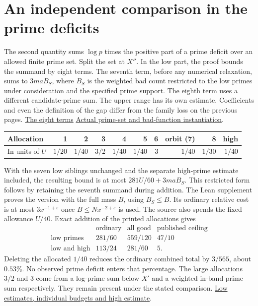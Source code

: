 \documentclass[12pt,letterpaper]{article}
\newcommand{\orig}[3]{\href{https://github.com/nousentllc/riemann-hypothesis/blob/40e56bab026552e089d7afcfeff08d2defb9c005/src/#1.lean\#L#2}{#3}}
\newcommand{\pagepart}[1]{\clearpage\section{#1}}
\begin{document}
\pagepart{An independent comparison in the prime deficits}
The second quantity sums \(\log p\) times the positive part of a prime deficit over an allowed finite prime set. Split the set at \(X''\). In the low part, the proof bounds the summand by eight terms. The seventh term, before any numerical relaxation, sums to \(3maB_S\), where \(B_S\) is the weighted bad count restricted to the low primes under consideration and the specified prime support. The eighth term uses a different candidate-prime sum. The upper range has its own estimate. Coefficients and even the definition of the gap differ from the family loss on the previous pages.
\orig{Formalism/SharpRestriction/GrowthBounds/LogarithmicSums/SecondConstantNonneg}{85}{The eight terms}\quad
\orig{Formalism/SharpRestriction/GrowthBounds/LogarithmicSums/LatticeChainSuccOfPartial}{189}{Actual prime-set and bad-function instantiation}.

\begin{center}\small
\begin{tabular}{@{}lrrrrrrrrr@{}}
\toprule
Allocation & 1 & 2 & 3 & 4 & 5 & 6 & orbit (7) & 8 & high\\\midrule
In units of \(U\) & \(1/20\) & \(1/40\) & \(3/2\) & \(1/40\) & \(1/40\) & \(3\) & \(1/40\) & \(1/30\) & \(1/40\)\\\bottomrule
\end{tabular}
\end{center}
With the seven low siblings unchanged and the separate high-prime estimate included, the resulting bound is at most \(281U/60+3maB_S\). This restricted form follows by retaining the seventh summand during addition. The Lean supplement proves the version with the full mass \(B\), using \(B_S\le B\). Its ordinary relative cost is at most \(3x^{-1+\varepsilon}\) once \(B\le Nx^{-2+\varepsilon}\) is used. The source also spends the fixed allowance \(U/40\). Exact addition of the printed allocations gives
\[
\begin{array}{lccc}
 & \text{ordinary} & \text{all good} & \text{published ceiling}\\
 \text{low primes} & 281/60 & 559/120 & 47/10\\
 \text{low and high} &113/24 & 281/60 &5 .
\end{array}
\]
Deleting the allocated \(1/40\) reduces the ordinary combined total by \(3/565\), about \(0.53\%\). No observed prime deficit enters that percentage. The large allocations \(3/2\) and \(3\) come from a log-prime sum below \(X'\) and a weighted in-band prime sum respectively. They remain present under the stated comparison.
\orig{Formalism/SharpRestriction/GrowthBounds/LogarithmicSums/LatticeChainSuccOfPartial}{29}{Low estimates, individual budgets and high estimate}.
\end{document}
